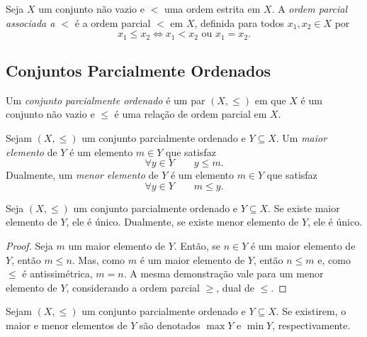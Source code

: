 \begin{defi}
	Seja $X$ um conjunto não vazio e $<$ uma ordem estrita em $X$. A \emph{ordem parcial associada a $<$} é a ordem parcial $<$ em $X$, definida para todos $x_1,x_2 \in X$ por
	\begin{equation*}
	x_1 \leq x_2 \Leftrightarrow x_1 < x_2 \text{\ \ ou\ \ } x_1 = x_2.
	\end{equation*}
\end{defi}

\subsection{Conjuntos Parcialmente Ordenados}

\begin{defi}
	Um \emph{conjunto parcialmente ordenado} é um par $(X,\leq)$ em que $X$ é um conjunto não vazio e $\leq$ é uma relação de ordem parcial em $X$.
\end{defi}

\begin{defi}
	Sejam $(X,\leq)$ um conjunto parcialmente ordenado e $Y \subseteq X$. Um \emph{maior elemento} de $Y$ é um elemento $m \in Y$ que satisfaz
	\begin{equation*}
	\forall y \in Y \qquad y \leq m.
	\end{equation*}
Dualmente, um \emph{menor elemento} de $Y$ é um elemento $m \in Y$ que satisfaz
	\begin{equation*}
	\forall y \in Y \qquad m \leq y.
	\end{equation*}
\end{defi}

\begin{prop}
	Seja $(X,\leq)$ um conjunto parcialmente ordenado e $Y \subseteq X$. Se existe maior elemento de $Y$, ele é único. Dualmente, se existe menor elemento de $Y$, ele é único.
\end{prop}
\begin{proof}
	Seja $m$ um maior elemento de $Y$. Então, se $n \in Y$ é um maior elemento de $Y$, então $m \leq n$. Mas, como $m$ é um maior elemento de $Y$, então $n \leq m$ e, como $\leq$ é antissimétrica, $m=n$. A mesma demonstração vale para um menor elemento de $Y$, considerando a ordem parcial $\geq$, dual de $\leq$.
\end{proof}

\begin{nota}
	Sejam $(X,\leq)$ um conjunto parcialmente ordenado e $Y \subseteq X$. Se existirem, o maior e menor elementos de $Y$ são denotados $\max Y$ e $\min Y$, respectivamente.
\end{nota}

